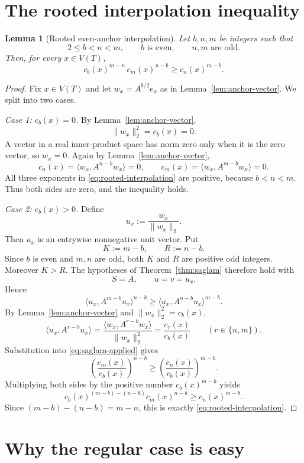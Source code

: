 \documentclass[11pt]{article}
\newtheorem{lemma}[theorem]{Lemma}
\newcommand{\1}{\mathbf{1}}
\begin{document}
\section{The rooted interpolation inequality}

\begin{lemma}[Rooted even-anchor interpolation]\label{lem:rooted-interpolation}
Let $b,n,m$ be integers such that
\[
  2\le b<n<m,
  \qquad
  b\text{ is even},
  \qquad
  n,m\text{ are odd}.
\]
Then, for every $x\in V(T)$,
\[
  c_b(x)^{m-n}\,c_m(x)^{n-b}
  \ge
  c_n(x)^{m-b}.
  \tag{3.1}\label{eq:rooted-interpolation}
\]
\end{lemma}

\begin{proof}
Fix $x\in V(T)$ and let $w_x=A^{b/2}e_x$ as in
Lemma~\ref{lem:anchor-vector}.  We split into two cases.

\smallskip
\noindent
\emph{Case 1: $c_b(x)=0$.}
By Lemma~\ref{lem:anchor-vector},
\[
  \|w_x\|_2^2=c_b(x)=0.
\]
A vector in a real inner-product space has norm zero only when it is the zero
vector, so $w_x=0$.  Again by Lemma~\ref{lem:anchor-vector},
\[
  c_n(x)=\langle w_x,A^{n-b}w_x\rangle=0,
  \qquad
  c_m(x)=\langle w_x,A^{m-b}w_x\rangle=0.
\]
All three exponents in \eqref{eq:rooted-interpolation} are positive, because
$b<n<m$.  Thus both sides are zero, and the inequality holds.

\smallskip
\noindent
\emph{Case 2: $c_b(x)>0$.}
Define
\[
  u_x:=\frac{w_x}{\|w_x\|_2}.
\]
Then $u_x$ is an entrywise nonnegative unit vector.  Put
\[
  K:=m-b,
  \qquad
  R:=n-b.
\]
Since $b$ is even and $m,n$ are odd, both $K$ and $R$ are positive odd
integers.  Moreover $K>R$.  The hypotheses of
Theorem~\ref{thm:saglam} therefore hold with
\[
  S=A,
  \qquad
  u=v=u_x.
\]
Hence
\[
  \langle u_x,A^{m-b}u_x\rangle^{n-b}
  \ge
  \langle u_x,A^{n-b}u_x\rangle^{m-b}.
  \tag{3.2}\label{eq:saglam-applied}
\]
By Lemma~\ref{lem:anchor-vector} and
$\|w_x\|_2^2=c_b(x)$,
\[
  \langle u_x,A^{r-b}u_x\rangle
  =\frac{\langle w_x,A^{r-b}w_x\rangle}{\|w_x\|_2^2}
  =\frac{c_r(x)}{c_b(x)}
  \qquad(r\in\{n,m\}).
\]
Substitution into \eqref{eq:saglam-applied} gives
\[
  \left(\frac{c_m(x)}{c_b(x)}\right)^{n-b}
  \ge
  \left(\frac{c_n(x)}{c_b(x)}\right)^{m-b}.
\]
Multiplying both sides by the positive number $c_b(x)^{m-b}$ yields
\[
  c_b(x)^{(m-b)-(n-b)}c_m(x)^{n-b}
  \ge c_n(x)^{m-b}.
\]
Since $(m-b)-(n-b)=m-n$, this is exactly
\eqref{eq:rooted-interpolation}.
\end{proof}

\section{Why the regular case is easy}
\label{sec:regular}
\end{document}
